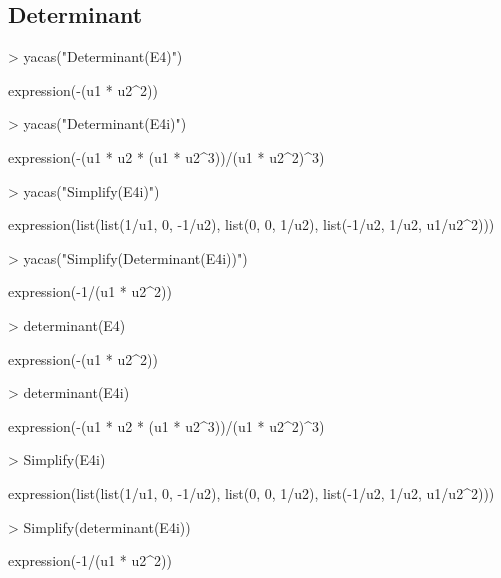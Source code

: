\documentclass[]{article}
\begin{document}
\subsection{Determinant}

\begin{Schunk}
\begin{Sinput}
> yacas("Determinant(E4)")
\end{Sinput}
\begin{Soutput}
expression(-(u1 * u2^2))
\end{Soutput}
\begin{Sinput}
> yacas("Determinant(E4i)")
\end{Sinput}
\begin{Soutput}
expression(-(u1 * u2 * (u1 * u2^3))/(u1 * u2^2)^3)
\end{Soutput}
\begin{Sinput}
> yacas("Simplify(E4i)")
\end{Sinput}
\begin{Soutput}
expression(list(list(1/u1, 0, -1/u2), list(0, 0, 1/u2), list(-1/u2, 
    1/u2, u1/u2^2)))
\end{Soutput}
\begin{Sinput}
> yacas("Simplify(Determinant(E4i))")
\end{Sinput}
\begin{Soutput}
expression(-1/(u1 * u2^2))
\end{Soutput}
\end{Schunk}


\begin{Schunk}
\begin{Sinput}
> determinant(E4)
\end{Sinput}
\begin{Soutput}
expression(-(u1 * u2^2))
\end{Soutput}
\begin{Sinput}
> determinant(E4i)
\end{Sinput}
\begin{Soutput}
expression(-(u1 * u2 * (u1 * u2^3))/(u1 * u2^2)^3)
\end{Soutput}
\begin{Sinput}
> Simplify(E4i)
\end{Sinput}
\begin{Soutput}
expression(list(list(1/u1, 0, -1/u2), list(0, 0, 1/u2), list(-1/u2, 
    1/u2, u1/u2^2)))
\end{Soutput}
\begin{Sinput}
> Simplify(determinant(E4i))
\end{Sinput}
\begin{Soutput}
expression(-1/(u1 * u2^2))
\end{Soutput}
\end{Schunk}
\end{document}
